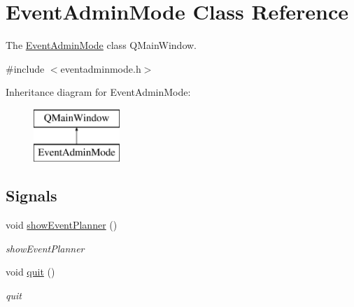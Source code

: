 \hypertarget{class_event_admin_mode}{}\section{Event\+Admin\+Mode Class Reference}
\label{class_event_admin_mode}


The \hyperlink{class_event_admin_mode}{Event\+Admin\+Mode} class  Q\+Main\+Window.  




{\ttfamily \#include $<$eventadminmode.\+h$>$}

Inheritance diagram for Event\+Admin\+Mode\+:\begin{figure}[H]
\begin{center}
\leavevmode
\includegraphics[height=2.000000cm]{class_event_admin_mode}
\end{center}
\end{figure}
\subsection*{Signals}
\begin{DoxyCompactItemize}
\item 
void \hyperlink{class_event_admin_mode_aff26ca6ac01a61846ccef0e55cc274de}{show\+Event\+Planner} ()
\begin{DoxyCompactList}\small\item\em show\+Event\+Planner \end{DoxyCompactList}\item 
void \hyperlink{class_event_admin_mode_a5fcf257db5008a3f634c3fcd13f06994}{quit} ()
\begin{DoxyCompactList}\small\item\em quit \end{DoxyCompactList}\end{DoxyCompactItemize}
